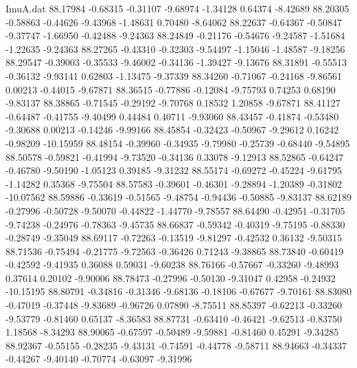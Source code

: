 \begin{filecontents}{ImuA.dat}
  88.17984   -0.68315   -0.31107   -9.68974   -1.34128    0.64374   -8.42689
  88.20305   -0.58863   -0.44626   -9.43968   -1.48631    0.70480   -8.64062
  88.22637   -0.64367   -0.50847   -9.37747   -1.66950   -0.42488   -9.24363
  88.24849   -0.21176   -0.54676   -9.24587   -1.51684   -1.22635   -9.24363
  88.27265   -0.43310   -0.32303   -9.54497   -1.15046   -1.48587   -9.18256
  88.29547   -0.39003   -0.35533   -9.46002   -0.34136   -1.39427   -9.13676
  88.31891   -0.55513   -0.36132   -9.93141    0.62803   -1.13475   -9.37339
  88.34260   -0.71067   -0.24168   -9.86561    0.00213   -0.44015   -9.67871
  88.36515   -0.77886   -0.12084   -9.75793    0.74253    0.68190   -9.83137
  88.38865   -0.71545   -0.29192   -9.70768    0.18532    1.20858   -9.67871
  88.41127   -0.64487   -0.41755   -9.40499    0.44484    0.40711   -9.93060
  88.43457   -0.41874   -0.53480   -9.30688    0.00213   -0.14246   -9.99166
  88.45854   -0.32423   -0.50967   -9.29612    0.16242   -0.98209  -10.15959
  88.48154   -0.39960   -0.34935   -9.79980   -0.25739   -0.68440   -9.54895
  88.50578   -0.59821   -0.41994   -9.73520   -0.34136    0.33078   -9.12913
  88.52865   -0.64247   -0.46780   -9.50190   -1.05123    0.39185   -9.31232
  88.55174   -0.69272   -0.45224   -9.61795   -1.14282    0.35368   -9.75504
  88.57583   -0.39601   -0.46301   -9.28894   -1.20389   -0.31802  -10.07562
  88.59886   -0.33619   -0.51565   -9.48754   -0.94436   -0.50885   -9.83137
  88.62189   -0.27996   -0.50728   -9.50070   -0.44822   -1.44770   -9.78557
  88.64490   -0.42951   -0.31705   -9.74238   -0.24976   -0.78363   -9.45735
  88.66837   -0.59342   -0.40319   -9.75195   -0.88330   -0.28749   -9.35049
  88.69117   -0.72263   -0.13519   -9.81297   -0.42532    0.36132   -9.50315
  88.71536   -0.75494   -0.21775   -9.72563   -0.36426    0.71243   -9.38865
  88.73840   -0.60419   -0.42592   -9.41935    0.36088    0.59031   -9.60238
  88.76166   -0.57667   -0.33260   -9.48993    0.37614    0.20102   -9.90006
  88.78473   -0.27996   -0.50130   -9.31047    0.42958   -0.24932  -10.15195
  88.80791   -0.34816   -0.31346   -9.68136   -0.18106   -0.67677   -9.70161
  88.83080   -0.47019   -0.37448   -9.83689   -0.96726    0.07890   -8.75511
  88.85397   -0.62213   -0.33260   -9.53779   -0.81460    0.65137   -8.36583
  88.87731   -0.63410   -0.46421   -9.62513   -0.83750    1.18568   -8.34293
  88.90065   -0.67597   -0.50489   -9.59881   -0.81460    0.45291   -9.34285
  88.92367   -0.55155   -0.28235   -9.43131   -0.74591   -0.44778   -9.58711
  88.94663   -0.34337   -0.44267   -9.40140   -0.70774   -0.63097   -9.31996

\end{filecontents}
